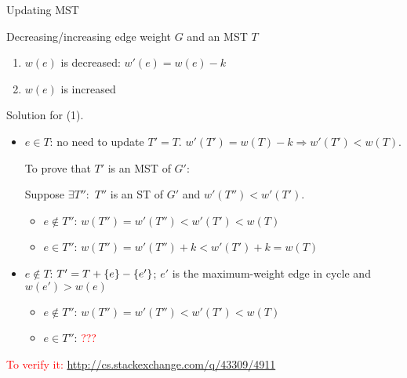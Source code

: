 \begin{frame}{Updating MST}
  \begin{exampleblock}{Decreasing/increasing edge weight }
    $G$ and an MST $T$
    \begin{enumerate}
      \item $w(e)$ is decreased: $w'(e) = w(e) - k$
      \item $w(e)$ is increased
    \end{enumerate}
  \end{exampleblock}

  \begin{block}{Solution for (1).}
    \begin{itemize}
      \item $e \in T$: no need to update $T' = T$.
	$w'(T') = w(T) - k \Rightarrow w'(T') < w(T)$.

	To prove that $T'$ is an MST of $G'$:

	Suppose $\exists T'':$ $T''$ is an ST of $G'$ and $w'(T'') < w'(T')$.
	\begin{itemize}
	  \item $e \notin T''$: $w(T'') = w'(T'') < w'(T') < w(T)$
	  \item $e \in T''$: $w(T'') = w'(T'') + k < w'(T') + k = w(T)$
	\end{itemize}
      \item $e \notin T$: $T' = T + \{e\} - \{e'\}$; $e'$ is the
	maximum-weight edge in cycle and $w(e') > w(e)$
	\begin{itemize}
	  \item $e \notin T''$: $w(T'') = w'(T'') < w'(T') < w(T)$
	  \item $e \in T''$: \textcolor{red}{???}
	\end{itemize}
    \end{itemize}
  \end{block}

  \textcolor{red}{To verify it:} \url{http://cs.stackexchange.com/q/43309/4911}
\end{frame}
